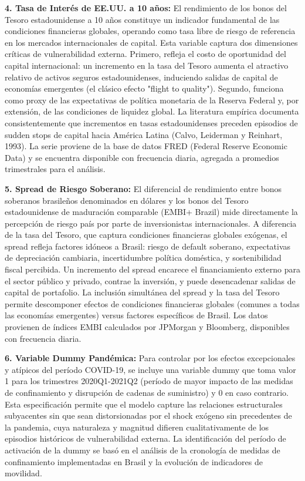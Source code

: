 \documentclass[3p,11pt]{elsarticle}
\begin{document}
\textbf{4. Tasa de Interés de EE.UU. a 10 años:} El rendimiento de los bonos del Tesoro estadounidense a 10 años constituye un indicador fundamental de las condiciones financieras globales, operando como tasa libre de riesgo de referencia en los mercados internacionales de capital. Esta variable captura dos dimensiones críticas de vulnerabilidad externa. Primero, refleja el costo de oportunidad del capital internacional: un incremento en la tasa del Tesoro aumenta el atractivo relativo de activos seguros estadounidenses, induciendo salidas de capital de economías emergentes (el clásico efecto "flight to quality"). Segundo, funciona como proxy de las expectativas de política monetaria de la Reserva Federal y, por extensión, de las condiciones de liquidez global. La literatura empírica documenta consistentemente que incrementos en tasas estadounidenses preceden episodios de sudden stops de capital hacia América Latina (Calvo, Leiderman y Reinhart, 1993). La serie proviene de la base de datos FRED (Federal Reserve Economic Data) y se encuentra disponible con frecuencia diaria, agregada a promedios trimestrales para el análisis.

\textbf{5. Spread de Riesgo Soberano:} El diferencial de rendimiento entre bonos soberanos brasileños denominados en dólares y los bonos del Tesoro estadounidense de maduración comparable (EMBI+ Brazil) mide directamente la percepción de riesgo país por parte de inversionistas internacionales. A diferencia de la tasa del Tesoro, que captura condiciones financieras globales exógenas, el spread refleja factores idóneos a Brasil: riesgo de default soberano, expectativas de depreciación cambiaria, incertidumbre política doméstica, y sostenibilidad fiscal percibida. Un incremento del spread encarece el financiamiento externo para el sector público y privado, contrae la inversión, y puede desencadenar salidas de capital de portafolio. La inclusión simultánea del spread y la tasa del Tesoro permite descomponer efectos de condiciones financieras globales (comunes a todas las economías emergentes) versus factores específicos de Brasil. Los datos provienen de índices EMBI calculados por JPMorgan y Bloomberg, disponibles con frecuencia diaria.

\textbf{6. Variable Dummy Pandémica:} Para controlar por los efectos excepcionales y atípicos del período COVID-19, se incluye una variable dummy que toma valor 1 para los trimestres 2020Q1-2021Q2 (período de mayor impacto de las medidas de confinamiento y disrupción de cadenas de suministro) y 0 en caso contrario. Esta especificación permite que el modelo capture las relaciones estructurales subyacentes sin que sean distorsionadas por el shock exógeno sin precedentes de la pandemia, cuya naturaleza y magnitud difieren cualitativamente de los episodios históricos de vulnerabilidad externa. La identificación del período de activación de la dummy se basó en el análisis de la cronología de medidas de confinamiento implementadas en Brasil y la evolución de indicadores de movilidad.
\end{document}
